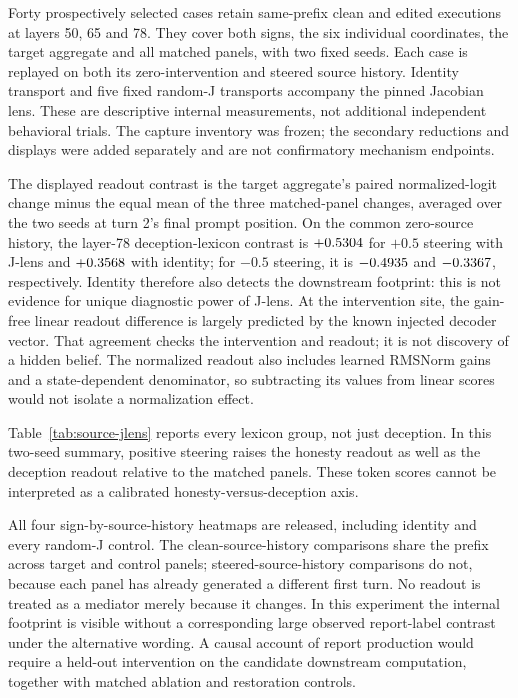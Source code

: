 Forty prospectively selected cases retain same-prefix clean and edited
executions at layers 50, 65 and 78. They cover both signs, the six individual
coordinates, the target aggregate and all matched panels, with two fixed
seeds. Each case is replayed on both its zero-intervention and steered source
history. Identity transport and five fixed random-J transports accompany the
pinned Jacobian lens. These are descriptive internal measurements, not
additional independent behavioral trials.
The capture inventory was frozen; the secondary reductions and displays
were added separately and are not confirmatory mechanism endpoints.

The displayed readout contrast is the target aggregate's paired normalized-logit
change minus the equal mean of the three matched-panel changes, averaged over
the two seeds at turn 2's final prompt position. On the common zero-source
history, the layer-78 deception-lexicon contrast is
$+0.5304{}$ for $+0.5$ steering with J-lens and
$+0.3568{}$ with identity; for $-0.5$ steering,
it is $-0.4935{}$ and
$-0.3367{}$, respectively. Identity therefore also detects the
downstream footprint: this is not evidence for unique diagnostic power of
J-lens. At the intervention site, the gain-free linear
readout difference is largely predicted by the known injected decoder vector.
That agreement checks the intervention and readout; it is not discovery of a
hidden belief. The normalized readout also includes learned RMSNorm gains
and a state-dependent denominator, so subtracting its values from linear
scores would not isolate a normalization effect.

Table~\ref{tab:source-jlens} reports every lexicon group, not just deception.
In this two-seed summary, positive steering raises the honesty readout as
well as the deception readout relative to the matched panels. These token
scores cannot be interpreted as a calibrated honesty-versus-deception axis.

\begin{table}[htbp]
\centering
\caption{\textbf{Downstream footprint with semantic and transport comparators.}
Both signs of the fixed-six aggregate, on the shared zero-source history.
The random-transport range is descriptive, not a confidence interval.}
\label{tab:source-jlens}

\end{table}

All four sign-by-source-history heatmaps are released, including identity
and every random-J control. The clean-source-history comparisons share the
prefix across target and control panels; steered-source-history comparisons
do not, because each panel has already generated a different first turn.
No readout is treated as a mediator merely because it changes. In this
experiment the internal footprint is visible without a corresponding large
observed report-label contrast under the alternative wording. A causal account of report production would require
a held-out intervention on the candidate downstream computation, together
with matched ablation and restoration controls.

